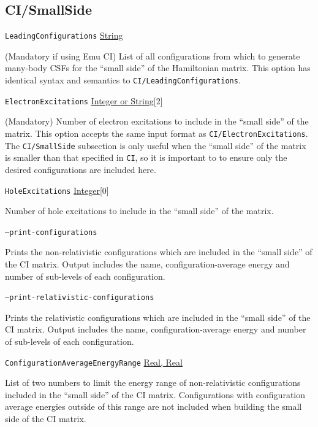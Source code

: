 \documentclass{report}
\begin{document}
\subsection{CI/SmallSide}
\texttt{LeadingConfigurations} \uline{String}
\begin{adjustwidth}{1cm}{}
(Mandatory if using Emu CI) List of all configurations from which to generate many-body CSFs for the 
``small side'' of the Hamiltonian matrix. This option has identical syntax and semantics to
\texttt{CI/LeadingConfigurations}.
\end{adjustwidth}

\texttt{ElectronExcitations} \uline{Integer or String}[2]
\begin{adjustwidth}{1cm}{}
(Mandatory) Number of electron excitations to include in the ``small side'' of the matrix. This option
accepts the same input format as \texttt{CI/ElectronExcitations}. The \texttt{CI/SmallSide} subsection
is only useful when the ``small side'' of the matrix is smaller than that specified in \texttt{CI}, so
it is important to to ensure only the desired configurations are included here.
\end{adjustwidth}

\texttt{HoleExcitations} \uline{Integer}[0]
\begin{adjustwidth}{1cm}{}
Number of hole excitations to include in the ``small side'' of the matrix.
\end{adjustwidth}

\texttt{--print-configurations}
\begin{adjustwidth}{1cm}{}
Prints the non-relativistic configurations which are included in the ``small side'' of the CI matrix.
Output includes the name, configuration-average energy and number of sub-levels of each configuration.
\end{adjustwidth}

\texttt{--print-relativistic-configurations}
\begin{adjustwidth}{1cm}{}
Prints the relativistic configurations which are included in the ``small side'' of the CI matrix.
Output includes the name, configuration-average energy and number of sub-levels of each configuration.
\end{adjustwidth}

\texttt{ConfigurationAverageEnergyRange} \uline{Real, Real}
\begin{adjustwidth}{1cm}{}
List of two numbers to limit the energy range of non-relativistic configurations included in the ``small
side'' of the CI matrix.
Configurations with configuration average energies outside of this range are not included when building
the small side of the CI matrix.
\end{adjustwidth}
\end{document}
